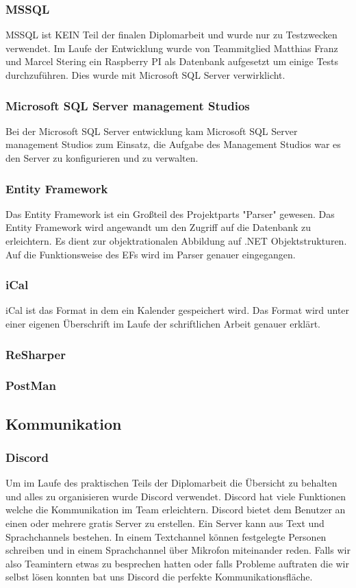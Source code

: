 \subsubsection {MSSQL}
MSSQL ist KEIN Teil der finalen Diplomarbeit und wurde nur zu Testzwecken verwendet. Im Laufe der Entwicklung wurde von Teammitglied Matthias Franz und Marcel Stering ein Raspberry PI als Datenbank aufgesetzt um einige Tests durchzuführen. Dies wurde mit Microsoft SQL Server verwirklicht. 
\subsubsection {Microsoft SQL Server management Studios}
Bei der Microsoft SQL Server entwicklung kam Microsoft SQL Server management Studios zum Einsatz, die Aufgabe des Management Studios war es den Server zu konfigurieren und zu verwalten. 
\subsubsection {Entity Framework}
Das Entity Framework ist ein Großteil des Projektparts "Parser" gewesen. Das Entity Framework wird angewandt um den Zugriff auf die Datenbank zu erleichtern. Es dient zur objektrationalen Abbildung auf .NET Objektstrukturen. Auf die Funktionsweise des EFs wird im Parser genauer eingegangen.

\subsubsection {iCal}
iCal ist das Format in dem ein Kalender gespeichert wird. Das Format wird unter einer eigenen Überschrift im Laufe der schriftlichen Arbeit genauer erklärt. 
\subsubsection {ReSharper}
\subsubsection {PostMan}


\subsection{Kommunikation}
\subsubsection {Discord}
Um im Laufe des praktischen Teils der Diplomarbeit die Übersicht zu behalten und alles zu organisieren wurde Discord verwendet. Discord hat viele Funktionen welche die Kommunikation im Team erleichtern. Discord bietet dem Benutzer an einen oder mehrere gratis Server zu erstellen. Ein Server kann aus Text und Sprachchannels bestehen. In einem Textchannel können festgelegte Personen schreiben und in einem Sprachchannel über Mikrofon miteinander reden. Falls wir also Teamintern etwas zu besprechen hatten oder falls Probleme auftraten die wir selbst lösen konnten bat uns Discord die perfekte Kommunikationsfläche. 

